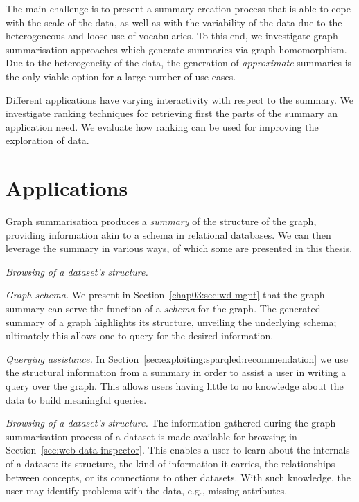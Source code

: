 The main challenge is to present a summary creation process that is able to cope with the scale of the data, as well as with the variability of the data due to the heterogeneous and loose use of vocabularies. To this end, we investigate graph summarisation approaches which generate summaries via graph homomorphism. Due to the heterogeneity of the data, the generation of \emph{approximate} summaries is the only viable option for a large number of use cases.

Different applications have varying interactivity with respect to the summary. We investigate ranking techniques for retrieving first the parts of the summary an application need. We evaluate how ranking can be used for improving the exploration of data.

\section{Applications}

Graph summarisation produces a \emph{summary} of the structure of the graph, providing information akin to a schema in relational databases. We can then leverage the summary in various ways, of which some are presented in this thesis.

\begin{labeling}{\emph{Browsing of a dataset's structure.}}
\item[\emph{Graph schema.}] We present in Section~\ref{chap03:sec:wd-mgnt} that the graph summary can serve the function of a \emph{schema} for the graph. The generated summary of a graph highlights its structure, unveiling the underlying schema; ultimately this allows one to query for the desired information.
\item[\emph{Querying assistance.}] In Section~\ref{sec:exploiting:sparqled:recommendation} we use the structural information from a summary in order to assist a user in writing a query over the graph. This allows users having little to no knowledge about the data to build meaningful queries.
\item[\emph{Browsing of a dataset's structure.}] The information gathered during the graph summarisation process of a dataset is made available for browsing in Section~\ref{sec:web-data-inspector}. This enables a user to learn about the internals of a dataset: its structure, the kind of information it carries, the relationships between concepts, or its connections to other datasets. With such knowledge, the user may identify problems with the data, e.g., missing attributes.
\end{labeling}


